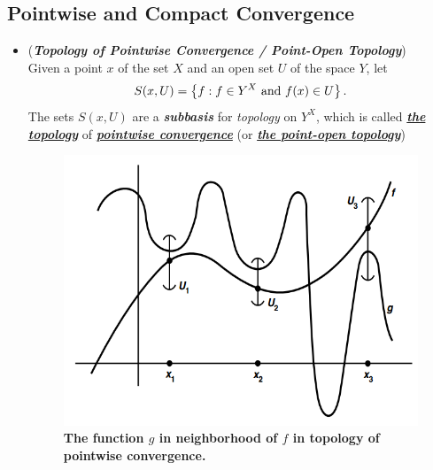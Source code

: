 \documentclass[11pt]{article}
\begin{document}
\subsection{Pointwise and Compact Convergence}
\begin{itemize}
\item \begin{definition} (\emph{\textbf{Topology of Pointwise Convergence / Point-Open Topology}})\\
Given a point $x$ of the set $X$ and an open set $U$ of the space $Y$, let
\begin{align*}
S(x, U) = \left\{f:  f \in Y^X\text{ and }f(x) \in U\right\}.
\end{align*}
The sets $S(x, U)$ are a \emph{\textbf{subbasis}} for \emph{topology} on $Y^X$, which is called \underline{\emph{\textbf{the topology}}} of \underline{\emph{\textbf{pointwise convergence}}} (or \underline{\emph{\textbf{the point-open topology}}})
\end{definition}



\begin{figure}
\begin{minipage}[t]{1\linewidth}
  \centering
  \centerline{\includegraphics[scale = 0.4]{pointwise_convergence_topology.png}}
\end{minipage}
\caption{\footnotesize{\textbf{The function $g$ in neighborhood of $f$ in topology of pointwise convergence. \citep{munkres2000topology}}}}
\label{fig: pointwise_convergence_topology}
\end{figure}



\end{itemize}
\end{document}
